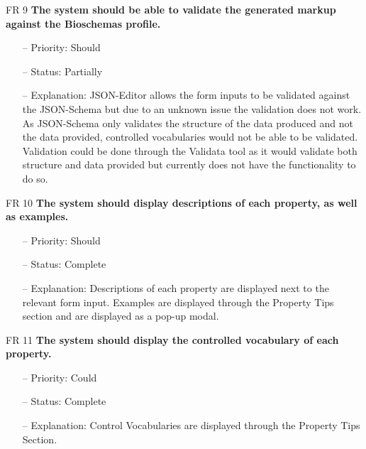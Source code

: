 \noindent
FR 9 \textbf{The system should be able to validate the generated markup against the Bioschemas profile.}
\begin{itemize}
\item[--] Priority: Should
\item[--] Status: Partially
\item[--] Explanation: JSON-Editor allows the form inputs to be validated against the JSON-Schema but due to an unknown issue the validation does not work. As JSON-Schema only validates the structure of the data produced and not the data provided, controlled vocabularies would not be able to be validated. Validation could be done through the Validata tool as it would validate both structure and data provided but currently does not have the functionality to do so.

\end{itemize}
\noindent
FR 10 \textbf{The system should display descriptions of each property, as well as examples.}
\begin{itemize}
\item[--] Priority: Should
\item[--] Status: Complete
\item[--] Explanation: Descriptions of each property are displayed next to the relevant form input. Examples are displayed through the Property Tips section and are displayed as a pop-up modal.
\end{itemize}
\noindent
FR 11 \textbf{The system should display the controlled vocabulary of each property.}
\begin{itemize}
\item[--] Priority: Could
\item[--] Status: Complete
\item[--] Explanation: Control Vocabularies are displayed through the Property Tips Section.
\end{itemize}

